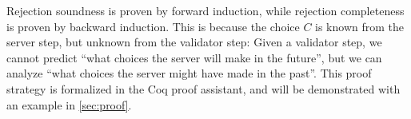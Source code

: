 Rejection soundness is proven by forward induction, while rejection completeness
is proven by backward induction.  This is because the choice $C$ is known from
the server step, but unknown from the validator step: Given a validator step, we
cannot predict ``what choices the server will make in the future'', but we can
analyze ``what choices the server might have made in the past''.  This proof
strategy is formalized in the Coq proof assistant, and will be demonstrated with
an example in \autoref{sec:proof}.
